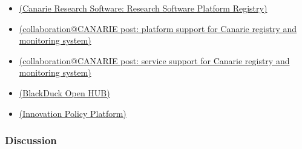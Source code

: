 \begin{itemize}
\item
\href{https://science.canarie.ca/researchmiddleware/platforms/list/main.html}{(Canarie Research Software: Research Software Platform Registry)}

\item
\href{https://collaboration.canarie.ca/elgg/file/view/2471/research-platform-support-for-the-canarie-registry-and-monitoring-system-revision-3}{(collaboration@CANARIE post: platform support for Canarie registry and monitoring system)}

\item
\href{https://collaboration.canarie.ca/elgg/file/view/2453/research-service-support-for-canarie-registry-and-monitoring-system-revision-7}{(collaboration@CANARIE post: service support for Canarie registry and monitoring system)}

\item
\href{https://www.openhub.net/}{(BlackDuck Open HUB)}

\item
\href{https://www.innovationpolicyplatform.org/frontpage}{(Innovation Policy Platform)}


\end{itemize}



\subsubsection{Discussion}


